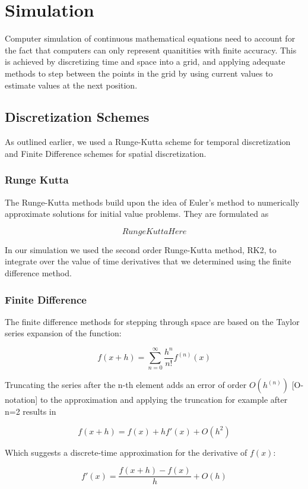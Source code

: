 \documentclass{article}
\begin{document}
\section{Simulation}
Computer simulation of continuous mathematical equations need to account for the fact that computers can only represent quanitities with finite accuracy. This is achieved by discretizing time and space into a grid, and applying adequate methods to step between the points in the grid by using current values to estimate values at the next position.

\subsection{Discretization Schemes}

As outlined earlier, we used a Runge-Kutta scheme for temporal discretization and Finite Difference schemes for spatial discretization.

\subsubsection*{Runge Kutta}

The Runge-Kutta methods build upon the idea of Euler's method to numerically approximate solutions for initial value problems. They are formulated as

$$Runge Kutta Here$$

In our simulation we used the second order Runge-Kutta method, RK2, to integrate over the value of time derivatives that we determined using the finite difference method.

\subsubsection*{Finite Difference}
The finite difference methods for stepping through space are based on the Taylor series expansion of the function:

$$f(x+h) = \sum_{n=0}^\infty \frac{h^n}{n!}f^{(n)}(x)$$

Truncating the series after the n-th element adds an error of order $O(h^{(n)})$ [O-notation] to the approximation and applying the truncation for example after n=2 results in 

$$f(x+h)=f(x)+hf'(x)+O(h^2)$$

Which suggests a discrete-time approximation for the derivative of $f(x)$:

$$f'(x)=\frac{f(x+h)-f(x)}{h}+O(h)$$
\end{document}
